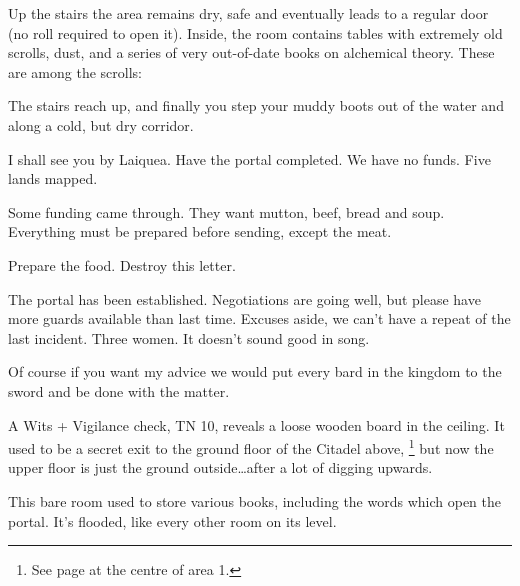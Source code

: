\begin{multicols}{2}

Up the stairs the area remains dry, safe and eventually leads to a regular door (no roll required to open it).  Inside, the room contains tables with extremely old scrolls, dust, and a series of very out-of-date books on alchemical theory.  These are among the scrolls:

\begin{boxtext}

	The stairs reach up, and finally you step your muddy boots out of the water and along a cold, but dry corridor.

\end{boxtext}

\begin{exampletext}

	I shall see you by Laiquea.  Have the portal completed.  We have no funds.  Five lands mapped.

\end{exampletext}

\begin{exampletext}

	Some funding came through.  They want mutton, beef, bread and soup.  Everything must be prepared before sending, except the meat.

	Prepare the food.  Destroy this letter.

\end{exampletext}

\begin{exampletext}

	The portal has been established.  Negotiations are going well, but please have more guards available than last time.  Excuses aside, we can't have a repeat of the last incident.  Three women.  It doesn't sound good in song.

	Of course if you want my advice we would put every bard in the kingdom to the sword and be done with the matter.

\end{exampletext}

A Wits + Vigilance check, TN 10, reveals a loose wooden board in the ceiling.
It used to be a secret exit to the ground floor of the Citadel above,%
\footnote{See page \pageref{lost_citadel} at the centre of area 1.}
but now the upper floor is just the ground outside\ldots after a lot of digging upwards.


This bare room used to store various books, including the words which open the portal.  It's flooded, like every other room on its level.


\end{multicols}
